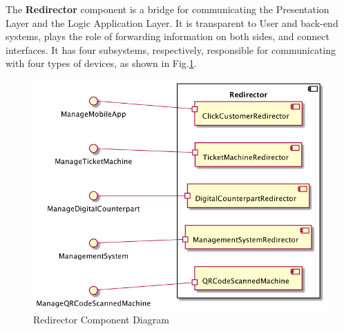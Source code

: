 \documentclass[a4paper,12pt]{report}
\begin{document}
The \textbf{Redirector} component is a bridge for communicating the Presentation Layer and the Logic Application Layer.
It is transparent to User and back-end systems, plays the role of forwarding information on both sides, and connect interfaces.
It has four subsystems, respectively, responsible for communicating with four types of devices, as shown in Fig.\ref{fig:component_diagram_redirector}.


\begin{figure}[H]
	\centering
	\includegraphics[scale=0.2]{component_diagram_redirector}
	\caption{Redirector Component Diagram}
	\centering
	\label{fig:component_diagram_redirector}
\end{figure}
\end{document}
